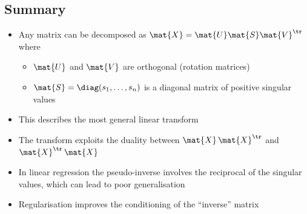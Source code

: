 \begin{slide}
\section[-2]{Summary}

\begin{PauseHighLight}
  \label{last}

  \begin{itemize}
  \item Any matrix can be decomposed as
    $\mat{X}=\mat{U}\mat{S}\mat{V}^\tr$ where
    \begin{itemize}
    \item $\mat{U}$ and $\mat{V}$ are orthogonal (rotation matrices)\pause
    \item $\mat{S}=\diag(s_1, \ldots, s_n)$ is a diagonal
      matrix of positive singular values\pause
    \end{itemize}
  \item This describes the most general linear transform\pause
  \item The transform exploits the duality between $\mat{X}\,\mat{X}^\tr$
    and $\mat{X}^\tr\,\mat{X}$\pause
  \item In linear regression the pseudo-inverse involves the reciprocal of
    the singular values, which can lead to poor generalisation\pause
  \item Regularisation improves the conditioning of the ``inverse'' matrix\pause
  \end{itemize}
\end{PauseHighLight}
\end{slide}



